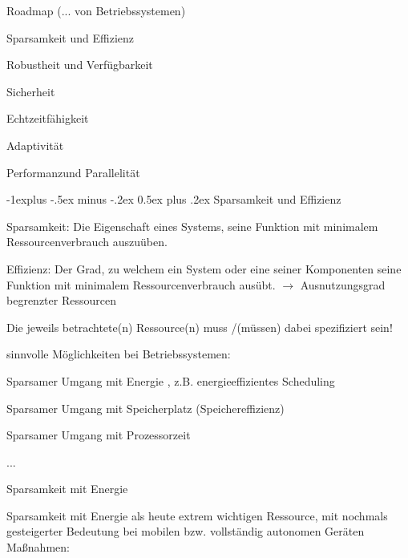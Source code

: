 \documentclass[a4paper]{article}
\makeatletter
\renewcommand{\subsection}{\@startsection{subsection}{2}{0mm}%
 {-1explus -.5ex minus -.2ex}%
 {0.5ex plus .2ex}%
 {\normalfont\normalsize\bfseries}}
\makeatother
\begin{document}
\begin{multicols}{3}
    Roadmap (... von Betriebssystemen)

    \begin{itemize*}
        \item
        Sparsamkeit und Effizienz
        \item
        Robustheit und Verfügbarkeit
        \item
        Sicherheit
        \item
        Echtzeitfähigkeit
        \item
        Adaptivität
        \item
        Performanzund Parallelität
    \end{itemize*}


    \subsection{Sparsamkeit und
        Effizienz}

    \begin{itemize*}
        \item
        Sparsamkeit: Die Eigenschaft eines Systems, seine Funktion mit
        minimalem Ressourcenverbrauch auszuüben.
        \item
        Effizienz: Der Grad, zu welchem ein System oder eine seiner
        Komponenten seine Funktion mit minimalem Ressourcenverbrauch ausübt.
        $\rightarrow$ Ausnutzungsgrad begrenzter Ressourcen
        \item
        Die jeweils betrachtete(n) Ressource(n) muss /(müssen) dabei
        spezifiziert sein!
        \item
        sinnvolle Möglichkeiten bei Betriebssystemen:
        \begin{enumerate*}

            \item Sparsamer Umgang mit Energie , z.B. energieeffizientes Scheduling
            \item Sparsamer Umgang mit Speicherplatz (Speichereffizienz)
            \item Sparsamer Umgang mit Prozessorzeit
            \item ...
        \end{enumerate*}
    \end{itemize*}

    Sparsamkeit mit Energie

    \begin{itemize*}
        \item
        Sparsamkeit mit Energie als heute extrem wichtigen Ressource, mit
        nochmals gesteigerter Bedeutung bei mobilen bzw. vollständig autonomen
        Geräten Maßnahmen:
    \end{itemize*}


\end{multicols}
\end{document}
